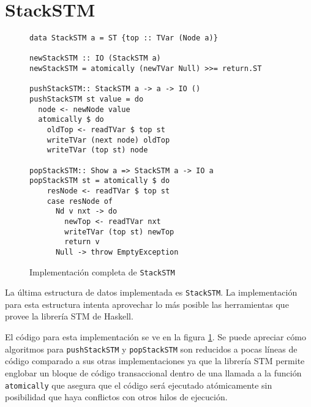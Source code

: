 \section{StackSTM}\label{sec:stackstm}
\begin{figure}[t]
  \centering
  \begin{verbatim}
data StackSTM a = ST {top :: TVar (Node a)}

newStackSTM :: IO (StackSTM a)
newStackSTM = atomically (newTVar Null) >>= return.ST

pushStackSTM:: StackSTM a -> a -> IO ()
pushStackSTM st value = do
  node <- newNode value
  atomically $ do
    oldTop <- readTVar $ top st
    writeTVar (next node) oldTop
    writeTVar (top st) node

popStackSTM:: Show a => StackSTM a -> IO a
popStackSTM st = atomically $ do
    resNode <- readTVar $ top st
    case resNode of
      Nd v nxt -> do
        newTop <- readTVar nxt
        writeTVar (top st) newTop
        return v
      Null -> throw EmptyException   
  \end{verbatim}
  \caption{Implementación completa de \texttt{StackSTM}}
  \label{fig:stack-stm}
\end{figure}
La última estructura de datos implementada es \texttt{StackSTM}. La implementación para esta estructura intenta aprovechar lo más posible las herramientas que provee la librería STM de Haskell.

El código para esta implementación se ve en la figura \ref{fig:stack-stm}. Se puede apreciar cómo algoritmos para \texttt{pushStackSTM} y \texttt{popStackSTM} son reducidos a pocas líneas de código comparado a sus otras implementaciones ya que la librería STM permite englobar un bloque de código transaccional dentro de una llamada a la función \texttt{atomically} que asegura que el código será ejecutado atómicamente sin posibilidad que haya conflictos con otros hilos de ejecución.

